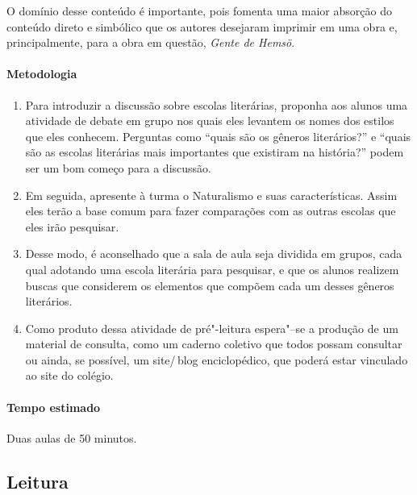 \documentclass[12pt]{extarticle}
\begin{document}
O domínio desse conteúdo é importante, pois fomenta uma maior absorção do 
conteúdo direto e simbólico que os autores desejaram imprimir em uma obra 
e, principalmente, para a obra em questão, \textit{Gente de Hemsö}.

\paragraph{Metodologia}

\begin{enumerate}

\item
Para introduzir a discussão sobre escolas literárias, proponha aos alunos
uma atividade de debate em grupo nos quais eles levantem os nomes dos 
estilos que eles conhecem. Perguntas como ``quais são os gêneros literários?'' 
e ``quais são as escolas literárias mais importantes que existiram na 
história?'' podem ser um bom começo para a discussão.

\item
Em seguida, apresente à turma o Naturalismo e suas características. Assim 
eles terão a base comum para fazer comparações com as outras escolas que 
eles irão pesquisar. 

\item
Desse modo, é aconselhado que a sala de aula seja dividida em grupos, cada 
qual adotando uma escola literária para pesquisar, e que os alunos realizem 
buscas que considerem os elementos que compõem cada um desses gêneros 
literários. 

\item
Como produto dessa atividade de pré"-leitura espera"--se a produção de um
material de consulta, como um caderno coletivo que todos possam consultar 
ou ainda, se possível, um site/\,blog enciclopédico, que poderá estar 
vinculado ao site do colégio.

\end{enumerate}

\paragraph{Tempo estimado} Duas aulas de 50 minutos. 


\subsection{Leitura}
\end{document}
